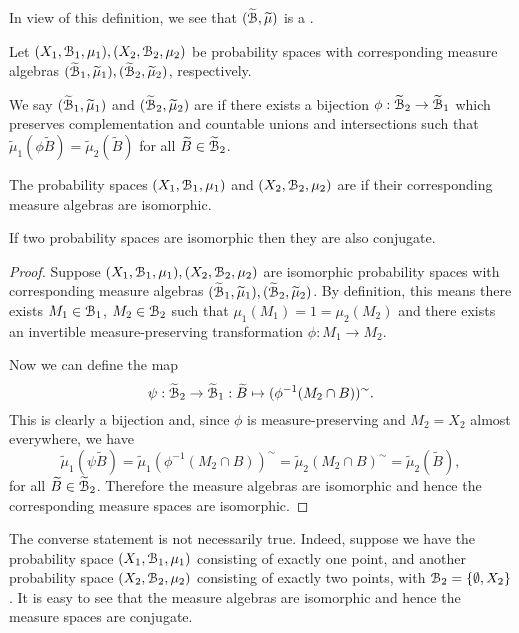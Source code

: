 In view of this definition, we see that $(\widetilde{\mathcal{B}}, \widetilde{\mu})$ is a .

\begin{definition}
	Let $(X_1, \mathcal{B}_1, \mu_1), (X_2, \mathcal{B}_2, \mu_2)$ be probability spaces with corresponding measure algebras $(\widetilde{\mathcal{B}}_1, \widetilde{\mu}_1), (\widetilde{\mathcal{B}}_2, \widetilde{\mu}_2)$, respectively.
	
	We say $(\widetilde{\mathcal{B}}_1, \widetilde{\mu}_1)$ and $(\widetilde{\mathcal{B}}_2, \widetilde{\mu}_2)$ are  if there exists a bijection $\phi : \widetilde{\mathcal{B}}_2 \to \widetilde{\mathcal{B}}_1$ which preserves complementation and countable unions and intersections such that $\tilde{\mu}_1(\phi \tilde{B}) = \tilde{\mu}_2(\tilde{B})$ for all $\widetilde{B} \in \widetilde{\mathcal{B}}_2$.
	
	The probability spaces $(X_1, \mathcal{B}_1, \mu_1)$ and $(X_2, \mathcal{B}_2, \mu_2)$ are  if their corresponding measure algebras are isomorphic.
\end{definition}

\begin{proposition}
	If two probability spaces are isomorphic then they are also conjugate.
	\begin{proof}
		Suppose $(X_1, \mathcal{B}_1, \mu_1), (X_2, \mathcal{B}_2, \mu_2)$ are isomorphic probability spaces with corresponding measure algebras $(\widetilde{\mathcal{B}}_1, \widetilde{\mu}_1), (\widetilde{\mathcal{B}}_2, \widetilde{\mu}_2)$. By definition, this means there exists $M_1 \in \mathcal{B}_1$, $M_2 \in \mathcal{B}_2$ such that $\mu_1(M_1) = 1 = \mu_2(M_2)$ and there exists an invertible measure-preserving transformation $\phi: M_1 \to M_2$.
		
		Now we can define the map
		\[
			\psi : \widetilde{\mathcal{B}}_2 \to \widetilde{\mathcal{B}}_1 : \widetilde{B} \mapsto (\phi^{-1}(M_2 \cap B))^\sim.
		\]
		This is clearly a bijection and, since $\phi$ is measure-preserving and $M_2 = X_2$ almost everywhere, we have
		\[
			\tilde{\mu}_1(\psi\tilde{B}) = \tilde{\mu}_1(\phi^{-1}(M_2 \cap B))^\sim = \tilde{\mu}_2(M_2 \cap B)^\sim = \tilde{\mu}_2(\tilde{B}),
		\]
		for all $\widetilde{B} \in \widetilde{\mathcal{B}}_2$. Therefore the measure algebras are isomorphic and hence the corresponding measure spaces are isomorphic.
	\end{proof}
\end{proposition}

The converse statement is not necessarily true. Indeed, suppose we have the probability space $(X_1, \mathcal{B}_1, \mu_1)$ consisting of exactly one point, and another probability space $(X_2, \mathcal{B}_2, \mu_2)$ consisting of exactly two points, with $\mathcal{B}_2 = \{\emptyset, X_2\}$. It is easy to see that the measure algebras are isomorphic and hence the measure spaces are conjugate.

